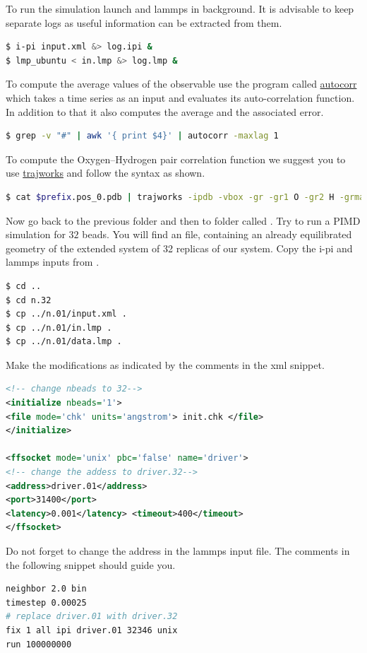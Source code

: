 \documentclass{article}
\begin{document}
\begin{Exercise}[label={basic},title={Benchmark of quantum effects in a water molecule}]
\Question
To run the simulation launch \ipi{} and lammps in background. It is advisable to keep separate logs as useful information can be extracted from them.
\begin{lstlisting}[language=bash]
$ i-pi input.xml &> log.ipi &
$ lmp_ubuntu < in.lmp &> log.lmp &
\end{lstlisting}
To compute the average values of the observable use the program called \url{autocorr} which takes a time series as an input and evaluates its auto-correlation function. In addition to that it also computes the average and the associated error.
\begin{lstlisting}[language=bash]
$ grep -v "#" | awk '{ print $4}' | autocorr -maxlag 1
\end{lstlisting}

\Question
To compute the Oxygen--Hydrogen pair correlation function we suggest you to use \url{trajworks} and follow the syntax as shown. 
\begin{lstlisting}[language=bash]
$ cat $prefix.pos_0.pdb | trajworks -ipdb -vbox -gr -gr1 O -gr2 H -grmax 2 -hwin triangle -hwinfac 5  > gOO.data 
\end{lstlisting}

\Question
Now go back to the previous folder and then to folder called . Try to run a PIMD simulation for $32$ beads. You will find an  file, containing an already equilibrated geometry of the extended system of 32 replicas of our system. Copy the i-pi and lammps inputs from .
\begin{lstlisting}[language=bash]
$ cd ..
$ cd n.32
$ cp ../n.01/input.xml .
$ cp ../n.01/in.lmp .
$ cp ../n.01/data.lmp .
\end{lstlisting}

\Question
Make the modifications as indicated by the comments in the xml snippet.
\begin{lstlisting}[language=xml]
<!-- change nbeads to 32--> 
<initialize nbeads='1'>  
<file mode='chk' units='angstrom'> init.chk </file>
</initialize>

<ffsocket mode='unix' pbc='false' name='driver'>
<!-- change the addess to driver.32--> 
<address>driver.01</address>
<port>31400</port>
<latency>0.001</latency> <timeout>400</timeout>
</ffsocket>
\end{lstlisting}

\Question
Do not forget to change the address in the lammps input file. The comments in the following snippet should guide you.
\begin{lstlisting}[language=sh]
neighbor 2.0 bin
timestep 0.00025
# replace driver.01 with driver.32
fix 1 all ipi driver.01 32346 unix
run 100000000
\end{lstlisting}


\end{Exercise}
\end{document}
